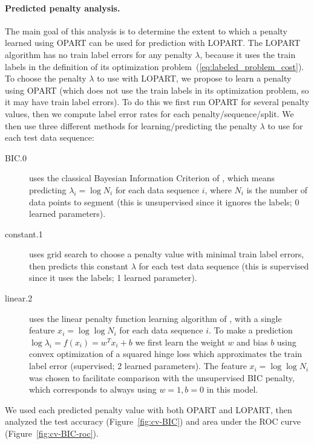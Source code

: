 \documentclass[12pt]{article}
\begin{document}
\paragraph{Predicted penalty analysis.} 
The main goal of this analysis is to determine the extent to which a penalty learned using OPART can be used for prediction with LOPART.
The LOPART algorithm has no train label errors for any penalty $\lambda$, because it uses the train labels in the definition of its optimization problem~(\ref{eq:labeled_problem_cost}).
To choose the penalty $\lambda$ to use with LOPART, we propose to learn a penalty using OPART (which does not use the train labels in its optimization problem, so it may have train label errors). 
To do this we first run OPART for several penalty values, then we compute label error rates for each penalty/sequence/split.
We then use three different methods for learning/predicting the penalty $\lambda$ to use for each test data sequence:
\begin{description}
\item[BIC.0] uses the classical Bayesian Information Criterion of \citet{Schwarz78}, which means predicting $\lambda_i=\log N_i$ for each data sequence $i$, where $N_i$ is the number of data points to segment (this is unsupervised since it ignores the labels; 0 learned parameters).
\item[constant.1] uses grid search to choose a penalty value with minimal train label errors, then predicts this constant $\lambda$ for each test data sequence (this is supervised since it uses the labels; 1 learned parameter).
\item[linear.2] uses the linear penalty function learning algorithm of \citet{HOCKING-penalties}, with a single feature $x_i = \log \log N_i$ for each data sequence $i$. To make a prediction $\log \lambda_i  = f(x_i) = w^T x_i + b$ we first learn the weight $w$ and bias $b$ using convex optimization of a squared hinge loss which approximates the train label error (supervised; 2 learned  parameters). The feature $x_i = \log \log N_i$ was chosen to facilitate comparison with the unsupervised BIC penalty, which corresponds to always using $w=1,b=0$ in this model.
\end{description}
We used each predicted penalty value with both OPART and LOPART, then analyzed the test accuracy (Figure~\ref{fig:cv-BIC}) and area under the ROC curve (Figure~\ref{fig:cv-BIC-roc}).
\end{document}
